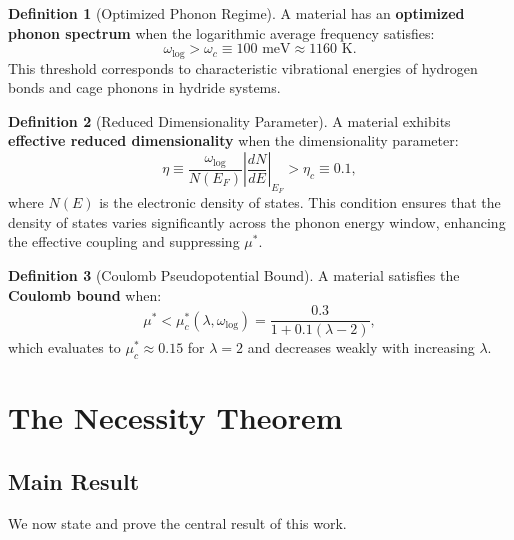 \documentclass[11pt,a4paper]{article}
\theoremstyle{definition}
\newtheorem{definition}{Definition}[section]
\begin{document}
\begin{definition}[Optimized Phonon Regime]\label{def:optphonon}
A material has an \textbf{optimized phonon spectrum} when the logarithmic average frequency satisfies:
\begin{equation}
\omega_{\text{log}} > \omega_c \equiv 100 \text{ meV} \approx 1160 \text{ K}.
\end{equation}
This threshold corresponds to characteristic vibrational energies of hydrogen bonds and cage phonons in hydride systems.
\end{definition}

\begin{definition}[Reduced Dimensionality Parameter]\label{def:lowdim}
A material exhibits \textbf{effective reduced dimensionality} when the dimensionality parameter:
\begin{equation}
\eta \equiv \frac{\omega_{\text{log}}}{N(E_F)}\left|\frac{dN}{dE}\right|_{E_F} > \eta_c \equiv 0.1,
\end{equation}
where $N(E)$ is the electronic density of states. This condition ensures that the density of states varies significantly across the phonon energy window, enhancing the effective coupling and suppressing $\mu^*$.
\end{definition}

\begin{definition}[Coulomb Pseudopotential Bound]\label{def:mubound}
A material satisfies the \textbf{Coulomb bound} when:
\begin{equation}
\mu^* < \mu_c^*(\lambda, \omega_{\text{log}}) = \frac{0.3}{1 + 0.1(\lambda - 2)},
\end{equation}
which evaluates to $\mu_c^* \approx 0.15$ for $\lambda = 2$ and decreases weakly with increasing $\lambda$.
\end{definition}

\section{The Necessity Theorem}\label{sec:proof}

\subsection{Main Result}

We now state and prove the central result of this work.
\end{document}
